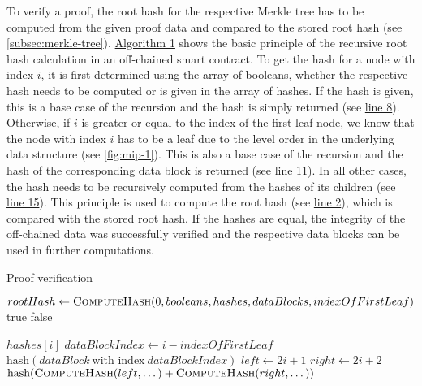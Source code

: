 			To verify a proof, the root hash for the respective Merkle tree has to be computed from the given proof data and compared to the stored root hash (see \autoref{subsec:merkle-tree}).
			\hyperref[alg:proof-verification]{Algorithm 1} shows the basic principle of the recursive root hash calculation in an off-chained smart contract.
			To get the hash for a node with index $i$, it is first determined using the array of booleans, whether the respective hash needs to be computed or is given in the array of hashes.
			If the hash is given, this is a base case of the recursion and the hash is simply returned (see \hyperref[algline:8]{line 8}).
			Otherwise, if $i$ is greater or equal to the index of the first leaf node, we know that the node with index $i$ has to be a leaf due to the level order in the underlying data structure (see \autoref{fig:mip-1}).
			This is also a base case of the recursion and the hash of the corresponding data block is returned (see \hyperref[algline:11]{line 11}).
			In all other cases, the hash needs to be recursively computed from the hashes of its children (see \hyperref[algline:15]{line 15}).
			This principle is used to compute the root hash (see \hyperref[algline:2]{line 2}), which is compared with the stored root hash.
			If the hashes are equal, the integrity of the off-chained data was successfully verified and the respective data blocks can be used in further computations.

			\begin{algorithm}
				\caption{Proof verification}
				\label{alg:proof-verification}

				\begin{algorithmic}[1]
						\State $rootHash \gets \Call{ComputeHash}{0, booleans, hashes, dataBlocks, indexOfFirstLeaf}$ \label{algline:2}
						 \Return true 
						\Else{} \Return false 
						\EndIf	
					\EndProcedure

					\State
						 
							\State \Return $hashes[i]$ \label{algline:8}
						 
							\State $dataBlockIndex \gets i - indexOfFirstLeaf$ 
							\State \Return $\textrm{hash}(dataBlock\ \textrm{with index}\ dataBlockIndex)$ \label{algline:11}
						\Else{} 
							\State $left \gets 2i + 1$ 
							\State $right \gets 2i + 2$ 
							\State \Return $\textrm{hash}(\Call{ComputeHash}{left, \dots} + \Call{ComputeHash}{right, \dots})$ \label{algline:15}
						\EndIf
					\EndProcedure
				\end{algorithmic}
			\end{algorithm}

			\clearpage

